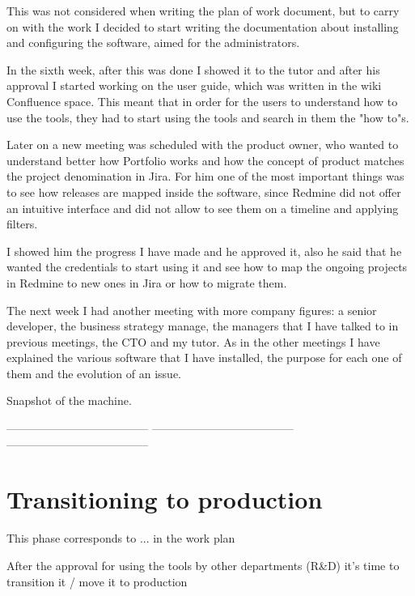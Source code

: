 	This was not considered when writing the plan of work document, but to carry on with the work I decided to start writing the documentation about installing and configuring the software, aimed for the administrators.
	
	In the sixth week, after this was done I showed it to the tutor and after his approval I started working on the user guide, which was written in the wiki Confluence space.
	This meant that in order for the users to understand how to use the tools, they had to start using the tools and search in them the "how to"s.
	
	Later on a new meeting was scheduled with the product owner, who wanted to understand better how Portfolio works and how the concept of product matches the project denomination in Jira.
	For him one of the most important things was to see how releases are mapped inside the software, since Redmine did not offer an intuitive interface and did not allow to see them on a timeline and applying filters.
	
	I showed him the progress I have made and he approved it, also he said that he wanted the credentials to start using it and see how to map the ongoing projects in Redmine to new ones in Jira or how to migrate them.
	
	
	The next week I had another meeting with more company figures: a senior developer, the business strategy manage, the managers that I have talked to in previous meetings, the CTO and my tutor.
	As in the other meetings I have explained the various software that I have installed, the purpose for each one of them and the evolution of an issue.
	
	Snapshot of the machine.
	
	--------------------------------------	--------------------------------------	--------------------------------------

\section{Transitioning to production}

	This phase corresponds to ... in the work plan

	After the approval for using the tools by other departments (R\&D) it's time to transition it / move it to production
	
